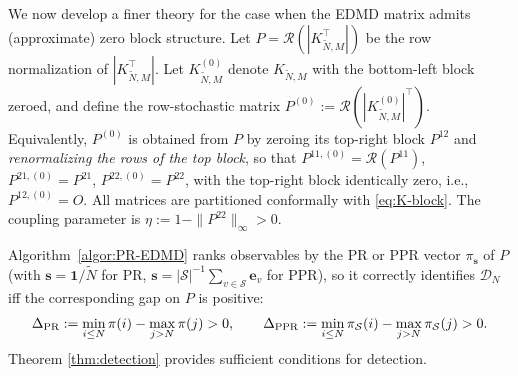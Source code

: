 \documentclass{article}
\theoremstyle{plain}
\theoremstyle{definition}
\def\tp{\intercal}
\def\Dc{\mathcal{D}}
\newcommand{\arXivtag}[1][]{#1}
\begin{document}
	\vspace{-0.2cm}
	We now develop a finer theory for the case when the EDMD matrix admits (approximate) zero block structure. Let $P = \mathcal{R}(|K_{\tilde{N},M}^{\tp}|)$ be the row normalization of $|K_{\tilde{N},M}^{\tp}|$. Let $K_{\tilde{N},M}^{(0)}$ denote $K_{\tilde{N},M}$ with the bottom-left block zeroed, and define the row-stochastic matrix $P^{(0)} := \mathcal{R}(|K_{\tilde{N},M}^{(0)}|^{\tp})$. 
    Equivalently, $P^{(0)}$ is obtained from $P$ by zeroing its top-right block $P^{12}$ and \emph{renormalizing \arXivtag[the rows of the top block]}, so that $P^{11,(0)} = \mathcal{R}(P^{11})$, $P^{21,(0)} = P^{21}$, $P^{22,(0)} = P^{22}$, with the top-right block identically zero, \arXivtag[i.e., $P^{12,(0)} = O$.] 
    All matrices are partitioned conformally with \eqref{eq:K-block}. The coupling parameter is $\eta := 1 - \|P^{22}\|_\infty > 0$. 

	Algorithm~\ref{algor:PR-EDMD} ranks observables by the PR or PPR vector $\pi_{\mathbf{s}}$ of $P$ (with $\mathbf{s} = \mathbf{1}/\tilde{N}$ for PR, $\mathbf{s} = |\mathcal{S}|^{-1}\sum_{v\in\mathcal{S}}\mathbf{e}_v$ for PPR), so it correctly identifies $\Dc_N$ iff the corresponding gap on $P$ is positive:
	\begin{equation}\label{eq:delta-defs}
		\Delta_{\textnormal{PR}} := \min_{i\leq N}\pi(i) - \max_{j > N}\pi(j) > 0, \qquad
		\Delta_{\textnormal{PPR}} := \min_{i\leq N}\pi_{\mathcal{S}}(i) - \max_{j > N}\pi_{\mathcal{S}}(j) > 0.
	\end{equation}
	Theorem \ref{thm:detection} provides sufficient conditions for detection. 
	
	
	
\end{document}
